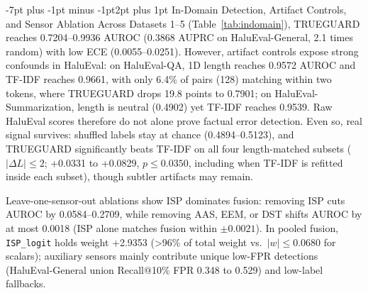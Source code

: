 \documentclass[10pt,twocolumn,letterpaper]{article}
\makeatletter
\renewcommand{\subsection}{\@startsection{subsection}{2}{\z@}%
  {-7pt plus -1pt minus -1pt}{2pt plus 1pt}%
  {\normalfont\normalsize\itshape\color{black}}}
\makeatother
\begin{document}
\subsection{In-Domain Detection, Artifact Controls, and Sensor Ablation}
Across Datasets 1--5 (Table~\ref{tab:indomain}), TRUEGUARD reaches 0.7204--0.9936 AUROC (0.3868 AUPRC on HaluEval-General, 2.1 times random) with low ECE (0.0055--0.0251). However, artifact controls expose strong confounds in HaluEval: on HaluEval-QA, 1D length reaches 0.9572 AUROC and TF-IDF reaches 0.9661, with only 6.4\% of pairs (128) matching within two tokens, where TRUEGUARD drops 19.8 points to 0.7901; on HaluEval-Summarization, length is neutral (0.4902) yet TF-IDF reaches 0.9539. Raw HaluEval scores therefore do not alone prove factual error detection. Even so, real signal survives: shuffled labels stay at chance (0.4894--0.5123), and TRUEGUARD significantly beats TF-IDF on all four length-matched subsets ($|\Delta L| \le 2$; +0.0331 to +0.0829, $p \le 0.0350$, including when TF-IDF is refitted inside each subset), though subtler artifacts may remain.

Leave-one-sensor-out ablations show ISP dominates fusion: removing ISP cuts AUROC by 0.0584--0.2709, while removing AAS, EEM, or DST shifts AUROC by at most 0.0018 (ISP alone matches fusion within $\pm 0.0021$). In pooled fusion, \texttt{ISP\_logit} holds weight +2.9353 (>96\% of total weight vs.\ $|w| \le 0.0680$ for scalars); auxiliary sensors mainly contribute unique low-FPR detections (HaluEval-General union Recall@10\% FPR 0.348 to 0.529) and low-label fallbacks.
\end{document}
